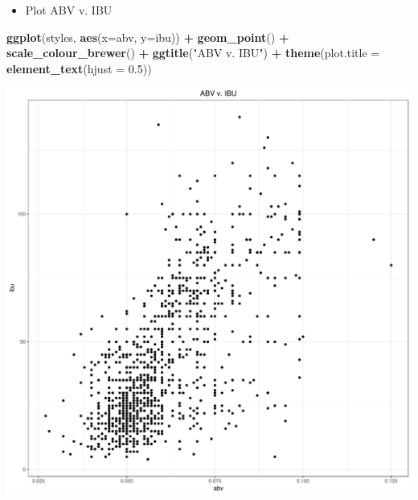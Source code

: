 \documentclass[]{article}
\newenvironment{Shaded}{\begin{snugshade}}{\end{snugshade}}
\newcommand{\KeywordTok}[1]{\textcolor[rgb]{0.13,0.29,0.53}{\textbf{#1}}}
\newcommand{\DataTypeTok}[1]{\textcolor[rgb]{0.13,0.29,0.53}{#1}}
\newcommand{\FloatTok}[1]{\textcolor[rgb]{0.00,0.00,0.81}{#1}}
\newcommand{\StringTok}[1]{\textcolor[rgb]{0.31,0.60,0.02}{#1}}
\newcommand{\CommentTok}[1]{\textcolor[rgb]{0.56,0.35,0.01}{\textit{#1}}}
\newcommand{\OperatorTok}[1]{\textcolor[rgb]{0.81,0.36,0.00}{\textbf{#1}}}
\newcommand{\NormalTok}[1]{#1}
\providecommand{\tightlist}{%
  \setlength{\itemsep}{0pt}\setlength{\parskip}{0pt}}
\begin{document}
\begin{Shaded}
\end{Shaded}

\begin{itemize}
\tightlist
\item
  Plot ABV v. IBU
\end{itemize}

\begin{Shaded}
\begin{Highlighting}[]
\KeywordTok{ggplot}\NormalTok{(styles, }\KeywordTok{aes}\NormalTok{(}\DataTypeTok{x=}\NormalTok{abv, }\DataTypeTok{y=}\NormalTok{ibu)) }\OperatorTok{+}
\StringTok{  }\KeywordTok{geom_point}\NormalTok{() }\OperatorTok{+}
\StringTok{  }\KeywordTok{scale_colour_brewer}\NormalTok{() }\OperatorTok{+}
\StringTok{  }\KeywordTok{ggtitle}\NormalTok{(}\StringTok{"ABV v. IBU"}\NormalTok{) }\OperatorTok{+}
\StringTok{  }\KeywordTok{theme}\NormalTok{(}\DataTypeTok{plot.title =} \KeywordTok{element_text}\NormalTok{(}\DataTypeTok{hjust =} \FloatTok{0.5}\NormalTok{))}
\end{Highlighting}
\end{Shaded}

\begin{center}\includegraphics{Analysis_Final_files/figure-latex/unnamed-chunk-22-1} \end{center}
\end{document}

